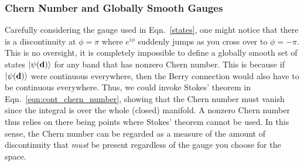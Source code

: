 \subsubsection{Chern Number and Globally Smooth Gauges}\label{sec:chern_smooth_gauge}
Carefully considering the gauge used in Eqn.~\ref{states}, one might notice that there is a discontinuity at $\phi = \pi$ where $e^{i\phi}$ suddenly jumps as you cross over to $\phi = -\pi$. This is no oversight, it is completely impossible to define a globally smooth set of states $\ket{\psi(\textbf{d})}$ for any band that has nonzero Chern number. This is because if $\ket{\psi(\textbf{d})}$ were continuous everywhere, then the Berry connection would also have to be continuous everywhere. Thus, we could invoke Stokes' theorem in Eqn.~\ref{eqn:cont_chern_number}, showing that the Chern number must vanish since the integral is over the whole (closed) manifold. A nonzero Chern number thus relies on there being points where Stokes' theorem cannot be used. In this sense, the Chern number can be regarded as a measure of the amount of discontinuity that \textit{must} be present regardless of the gauge you choose for the space.


